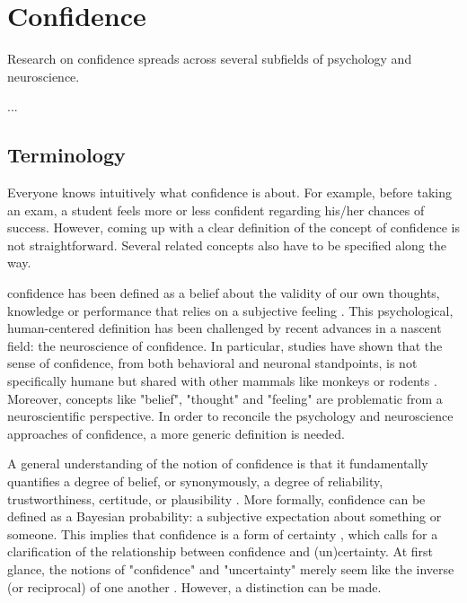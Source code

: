 \chapter{Confidence}

Research on \gls{confidence} spreads across several subfields of psychology and neuroscience.

...

\section{Terminology}

Everyone knows intuitively what \gls{confidence} is about. For example, before taking an exam, a student feels more or less confident regarding his/her chances of success. However, coming up with a clear definition of the concept of confidence is not straightforward. Several related concepts also have to be specified along the way.

\Gls{confidence} has been defined as a belief about the validity of our own thoughts, knowledge or performance that relies on a subjective feeling \cite{grimaldiThereAreThings2015}. This psychological, human-centered definition has been challenged by recent advances in a nascent field: the neuroscience of \gls{confidence}. In particular, studies have shown that the sense of \gls{confidence}, from both behavioral and neuronal standpoints, is not specifically humane but shared with other mammals like monkeys or rodents \cite{kepecsNeuralCorrelatesComputation2008}. Moreover, concepts like "belief", "thought" and "feeling" are problematic from a neuroscientific perspective. In order to reconcile the psychology and neuroscience approaches of \gls{confidence}, a more generic definition is needed.

A general understanding of the notion of \gls{confidence} is that it fundamentally quantifies a degree of belief, or synonymously, a degree of reliability, trustworthiness, certitude, or plausibility \cite{meynielConfidenceBayesianProbability2015}. More formally, \gls{confidence} can be defined as a Bayesian probability: a subjective expectation about something or someone. This implies that \gls{confidence} is a form of certainty \cite{pougetConfidenceCertaintyDistinct2016}, which calls for a clarification of the relationship between \gls{confidence} and (un)certainty. At first glance, the notions of "\gls{confidence}" and "\gls{uncertainty}" merely seem like the inverse (or reciprocal) of one another \cite{meynielConfidenceBayesianProbability2015}. However, a distinction can be made.

